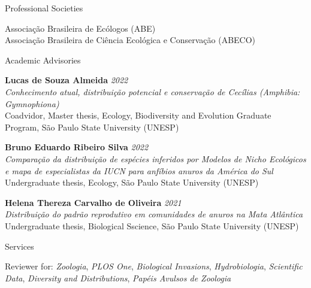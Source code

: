 \documentclass{resume}
\begin{document}

\begin{rSection}{Professional Societies}

Associação Brasileira de Ecólogos (ABE)
\\ Associação Brasileira de Ciência Ecológica e Conservação (ABECO)

\end{rSection}


\begin{rSection}{Academic Advisories}

{\bf Lucas de Souza Almeida} \hfill{\em 2022} \\ 
{\it Conhecimento atual, distribuição potencial e conservação de Cecílias (Amphibia: Gymnophiona)} \\
Coadvidor, Master thesis, Ecology, Biodiversity and Evolution Graduate Program, São Paulo State University (UNESP)

{\bf Bruno Eduardo Ribeiro Silva} \hfill{\em 2022} \\ 
{\it Comparação da distribuição de espécies inferidos por Modelos de Nicho Ecológicos e mapa de especialistas da IUCN para anfíbios anuros da América do Sul} \\
Undergraduate thesis, Ecology, São Paulo State University (UNESP)

{\bf Helena Thereza Carvalho de Oliveira} \hfill{\em 2021} \\ 
{\it Distribuição do padrão reprodutivo em comunidades de anuros na Mata Atlântica} \\
Undergraduate thesis, Biological Sscience, São Paulo State University (UNESP)

\end{rSection}


\begin{rSection}{Services}

Reviewer for: {\it Zoologia}, {\it PLOS One}, {\it Biological Invasions}, {\it Hydrobiologia}, {\it Scientific Data}, {\it Diversity and Distributions}, {\it Papéis Avulsos de Zoologia}

\end{rSection}
\end{document}
